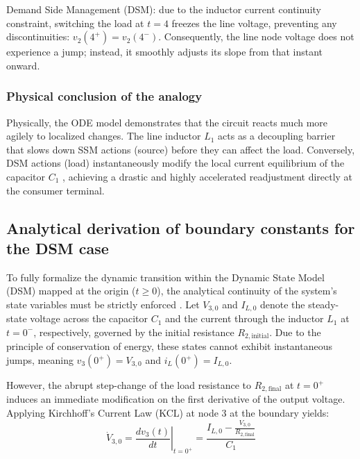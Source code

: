 \documentclass[energies,accept,oneauthor,pdftex]{Definitions/mdpi}
\begin{document}
\medskip
Demand Side Management (DSM): due to the inductor current continuity
constraint, switching the load at $t = 4$ freezes the line voltage, preventing
any discontinuities: $v_2 (4^+) = v_2(4^-)$. Consequently, the line node voltage
does not experience a jump; instead, it smoothly adjusts its slope from that
instant onward.

\subsubsection*{Physical conclusion of the analogy}

Physically, the ODE model demonstrates that the circuit reacts much more agilely
to localized changes. The line inductor $L_1$ acts as a decoupling barrier that slows down SSM actions (source) before they can affect the load. Conversely, DSM actions (load) instantaneously modify the local current equilibrium of the capacitor $C_1$ , achieving a drastic and highly accelerated readjustment directly at the consumer terminal.




\subsection{Analytical derivation of boundary constants for the DSM case}

To fully formalize the dynamic transition within the Dynamic State Model (DSM) mapped at the origin ($t \ge 0$), the analytical continuity of the system's state variables must be strictly enforced \cite{biom11020343}. Let $V_{3,0}$ and $I_{L,0}$ denote the steady-state voltage across the capacitor $C_1$ and the current through the inductor $L_1$ at $t=0^-$, respectively, governed by the initial resistance $R_{2,\text{initial}}$. Due to the principle of conservation of energy, these states cannot exhibit instantaneous jumps, meaning $v_3(0^+) = V_{3,0}$ and $i_L(0^+) = I_{L,0}$.

However, the abrupt step-change of the load resistance to $R_{2,\text{final}}$ at $t=0^+$ induces an immediate modification on the first derivative of the output voltage. Applying Kirchhoff's Current Law (KCL) at node 3 at the boundary yields:
\begin{equation}
    \dot{V}_{3,0} = \left.\frac{dv_3(t)}{dt}\right|_{t=0^+} = \frac{I_{L,0} - \frac{V_{3,0}}{R_{2,\text{final}}}}{C_1}
\end{equation}
\end{document}
